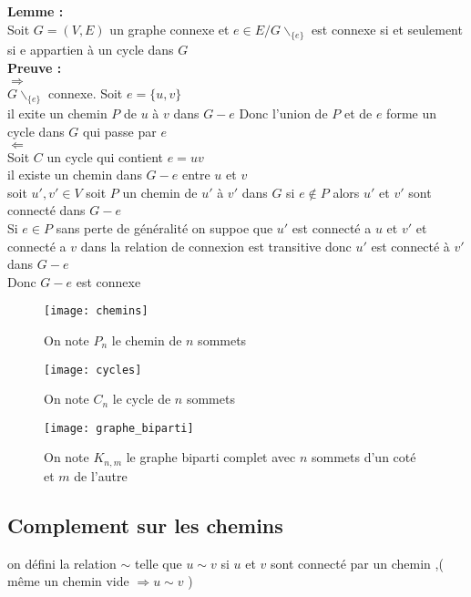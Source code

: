 \documentclass{report}
\newcommand{\preuve}{\textcolor[rgb]{0.95,0.25,0}{Preuve : }}
\newcommand{\Preuve}{\textbf{\preuve}}
\newcommand{\lemme}{\textcolor[rgb]{0,0.2,0.80}{Lemme : }}
\newcommand{\Lemme}{\textbf{\lemme}}
\begin{document}
\Lemme\\
Soit $G=(V,E)$  un graphe connexe et $e \in E/ G\backslash_{\{e\}}$ est connexe si et seulement si e appartien à un cycle dans $G$\\

\Preuve\\
$\Rightarrow$\\
$G\backslash_{\{e\}}$ connexe. Soit $e=\{u,v\}$\\
il exite un chemin $P$ de $u$ à $v$ dans $G-e$ Donc l'union de $P$ et de $e$ forme un cycle dans $G$ qui passe par $e$\\
$\Leftarrow$\\
Soit $C$ un cycle qui contient $e=uv$\\
il existe un chemin dans $G-e$ entre $u$ et $v$\\
soit $u',v' \in V$ soit $P$ un chemin de $u'$ à $v'$ dans $G$ si $e\notin P$ alors $u'$ et $v'$ sont connecté dans $G-e$\\

Si $e \in P$ sans perte de généralité on suppoe que $u'$ est connecté a $u$ et $v'$ et connecté a $v$ dans la relation de connexion est transitive donc $u'$ est connecté à $v'$ dans $G-e$\\
Donc $G-e$ est connexe\\

\begin{figure}[h]
	\centering
		\texttt{[image: chemins]}
	\caption{On note $P_n$ le chemin de $n$ sommets}
	\label{chemins}
\end{figure}

\begin{figure}[ht]
	\centering
		\texttt{[image: cycles]}
	\caption{On note $C_n$ le cycle de $n$ sommets}
	\label{cycles}
\end{figure}

\begin{figure}[ht]
	\centering
		\texttt{[image: graphe\_biparti]}
	\caption{On note $K_{n,m}$ le graphe biparti complet avec $n$ sommets d'un coté et $m$ de l'autre}
	\label{graphe_biparti}
\end{figure}

\subsection{Complement sur les chemins}

on défini la relation $\sim$ telle que $u \sim v$ si $u$ et $v$ sont connecté par un chemin ,( même un chemin vide $\Rightarrow u \sim v$ )\\
\end{document}
